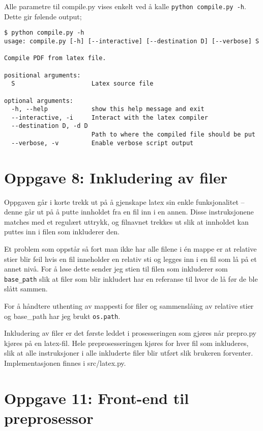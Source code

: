 \documentclass{article}
\begin{document}
Alle parametre til compile.py vises enkelt ved å kalle \verb;python compile.py -h;. Dette gir følende output;

\begin{Verbatim}[numbers=none,frame=lines,label=\fbox{{\tiny Terminal}},fontsize=\fontsize{9pt}{9pt},labelposition=topline,framesep=2.5mm,framerule=0.7pt]
$ python compile.py -h
usage: compile.py [-h] [--interactive] [--destination D] [--verbose] S

Compile PDF from latex file.

positional arguments:
  S                     Latex source file

optional arguments:
  -h, --help            show this help message and exit
  --interactive, -i     Interact with the latex compiler
  --destination D, -d D
                        Path to where the compiled file should be put
  --verbose, -v         Enable verbose script output
\end{Verbatim}
\noindent


\section*{Oppgave 8: Inkludering av filer}

Oppgaven går i korte trekk ut på å gjenskape latex sin enkle \-funksjonalitet – denne går ut på å putte innholdet fra en fil inn i en annen. Disse instruksjonene matches med et regulært uttrykk, og filnavnet trekkes ut slik at innholdet kan puttes inn i filen som inkluderer den.

Et problem som oppstår så fort man ikke har alle filene i én mappe er at relative stier blir feil hvis en fil inneholder en relativ sti og legges inn i en fil som lå på et annet nivå. For å løse dette sender jeg stien til filen som inkluderer som \verb;base_path; slik at filer som blir inkludert har en referanse til hvor de lå før de ble slått sammen.

For å håndtere uthenting av mappesti for filer og sammenslåing av relative stier og base\_path har jeg brukt \verb;os.path;.

Inkludering av filer er det første leddet i prosesseringen som gjøres når prepro.py kjøres på en latex-fil. Hele preprosesseringen kjøres for hver fil som inkluderes, slik at alle instruksjoner i alle inkluderte filer blir utført slik brukeren forventer. Implementasjonen finnes i src/latex.py.

\section*{Oppgave 11: Front-end til preprosessor}
\end{document}

